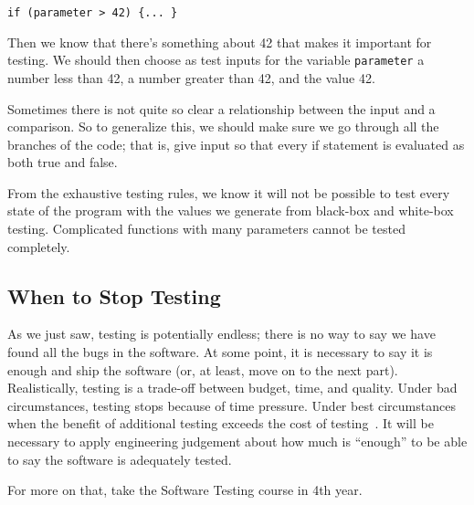 \texttt{if (parameter > 42) \{... \}}

Then we know that there's something about 42 that makes it important for testing. We should then choose as test inputs for the variable \texttt{parameter} a number less than 42, a number greater than 42, and the value 42. 

Sometimes there is not quite so clear a relationship between the input and a comparison. So to generalize this, we should make sure we go through all the branches of the code; that is, give input so that every if statement is evaluated as both true and false. 

From the exhaustive testing rules, we know it will not be possible to test every state of the program with the values we generate from black-box and white-box testing. Complicated functions with many parameters cannot be tested completely.

\subsection*{When to Stop Testing}
As we just saw, testing is potentially endless; there is no way to say we have found all the bugs in the software. At some point, it is necessary to say it is enough and ship the software (or, at least, move on to the next part). Realistically, testing is a trade-off between budget, time, and quality. Under bad circumstances, testing stops because of time pressure. Under best circumstances when the benefit of additional testing exceeds the cost of testing~\cite{pantest}. It will be necessary to apply engineering judgement about how much is ``enough'' to be able to say the software is adequately tested.


For more on that, take the Software Testing course in 4th year.




